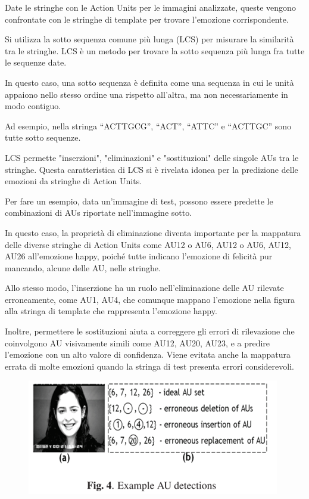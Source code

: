 Date le stringhe con le Action Units per le immagini analizzate, queste vengono confrontate con le stringhe di template per trovare l'emozione corrispondente. 

Si utilizza la sotto sequenza comune più lunga (LCS) \cite{IntroToAlgo} per misurare la similarità tra le stringhe. LCS è un metodo per trovare la sotto sequenza più lunga fra tutte le sequenze date. 

In questo caso, una sotto sequenza è definita come una sequenza in cui le unità appaiono nello stesso ordine una rispetto all’altra, ma non necessariamente in modo contiguo. 

Ad esempio, nella stringa “ACTTGCG”, “ACT”, “ATTC” e “ACTTGC” sono tutte sotto sequenze. 

LCS permette "inserzioni", "eliminazioni" e "sostituzioni" delle singole AUs tra le stringhe. Questa caratteristica di LCS si è rivelata idonea per la predizione delle emozioni da stringhe di Action Units.

Per fare un esempio, data un'immagine di test, possono essere predette le combinazioni di AUs riportate nell’immagine sotto.

In questo caso, la proprietà di eliminazione diventa importante per la mappatura delle diverse stringhe di Action Units come {AU12} o {AU6, AU12} o {AU6, AU12, AU26} all'emozione happy, poiché tutte indicano l’emozione di felicità pur mancando, alcune delle AU, nelle stringhe. 

Allo stesso modo, l'inserzione ha un ruolo nell’eliminazione delle AU rilevate erroneamente, come {AU1, AU4}, che comunque mappano l'emozione nella figura alla stringa di template che rappresenta l’emozione happy. 

Inoltre, permettere le sostituzioni aiuta a correggere gli errori di rilevazione che coinvolgono AU visivamente simili come AU12, AU20, AU23, e a predire l'emozione con un alto valore di confidenza. Viene evitata anche la mappatura errata di molte emozioni quando la stringa di test presenta errori considerevoli.
\begin{figure}
    \begin{center}    
        \includegraphics[width=1\linewidth]{images/21.png}
    \end{center}
\end{figure}

